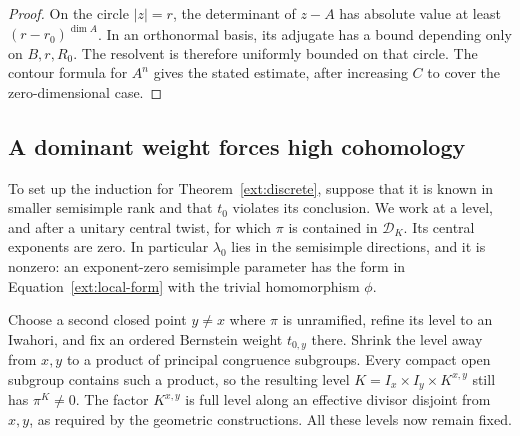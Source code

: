 \begin{proof}
 On the circle $|z|=r$, the determinant of $z-A$ has absolute value at
 least $(r-r_0)^{\dim A}$.  In an orthonormal basis, its adjugate has a
 bound depending only on $B,r,R_0$.  The resolvent is therefore uniformly
 bounded on that circle.  The contour formula for $A^n$ gives the stated
 estimate, after increasing $C$ to cover the zero-dimensional case.
\end{proof}

\subsection{A dominant weight forces high cohomology}

To set up the induction for Theorem~\ref{ext:discrete}, suppose that it
is known in smaller semisimple rank and that $t_0$ violates its conclusion.
We work at a level, and after a unitary central twist, for which $\pi$ is contained in
$\mathcal D_K$.  Its central exponents are zero.  In particular
$\lambda_0$ lies in the semisimple directions, and it is nonzero: an
exponent-zero semisimple parameter has the form in
Equation~\eqref{ext:local-form} with the trivial homomorphism $\phi$.

Choose a second closed point $y\ne x$ where $\pi$ is unramified, refine
its level to an Iwahori, and fix an ordered Bernstein weight $t_{0,y}$
there. Shrink the level away from $x,y$ to a product of principal
congruence subgroups.  Every compact open subgroup contains such a
product, so the resulting level
$K=I_x\times I_y\times K^{x,y}$ still has $\pi^K\ne0$.
The factor $K^{x,y}$ is full level along an effective divisor disjoint
from $x,y$, as required by the geometric constructions.
All these levels now remain fixed.

